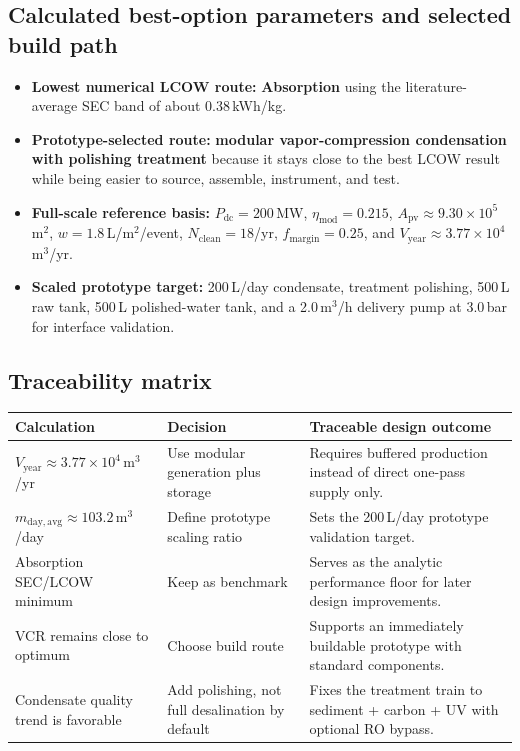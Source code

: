 \documentclass[11pt,a4paper]{article}
\begin{document}
\subsection{Calculated best-option parameters and selected build path}
\begin{itemize}[leftmargin=*]
  \item \textbf{Lowest numerical LCOW route:} \textbf{Absorption} using the literature-average SEC band of about 0.38\,kWh/kg.
  \item \textbf{Prototype-selected route:} \textbf{modular vapor-compression condensation with polishing treatment} because it stays close to the best LCOW result while being easier to source, assemble, instrument, and test.
  \item \textbf{Full-scale reference basis:} $P_{\mathrm{dc}}=200$\,MW, $\eta_{\mathrm{mod}}=0.215$, $A_{\mathrm{pv}}\approx 9.30\times 10^5$\,m$^2$, $w=1.8$\,L/m$^2$/event, $N_{\mathrm{clean}}=18$/yr, $f_{\mathrm{margin}}=0.25$, and $V_{\mathrm{year}}\approx 3.77\times 10^4$\,m$^3$/yr.
  \item \textbf{Scaled prototype target:} 200\,L/day condensate, treatment polishing, 500\,L raw tank, 500\,L polished-water tank, and a 2.0\,m$^3$/h delivery pump at 3.0\,bar for interface validation.
\end{itemize}

\subsection{Traceability matrix}
\begin{table}[h]
\centering
\small
\begin{tabular}{@{}p{4.0cm}p{4.0cm}p{6.8cm}@{}}
\toprule
\textbf{Calculation} & \textbf{Decision} & \textbf{Traceable design outcome} \\
\midrule
$V_{\mathrm{year}}\approx 3.77\times 10^4$\,m$^3$/yr & Use modular generation plus storage & Requires buffered production instead of direct one-pass supply only. \\
$m_{\mathrm{day,avg}}\approx 103.2$\,m$^3$/day & Define prototype scaling ratio & Sets the 200\,L/day prototype validation target. \\
Absorption SEC/LCOW minimum & Keep as benchmark & Serves as the analytic performance floor for later design improvements. \\
VCR remains close to optimum & Choose build route & Supports an immediately buildable prototype with standard components. \\
Condensate quality trend is favorable & Add polishing, not full desalination by default & Fixes the treatment train to sediment + carbon + UV with optional RO bypass. \\
\bottomrule
\end{tabular}
\end{table}
\end{document}
